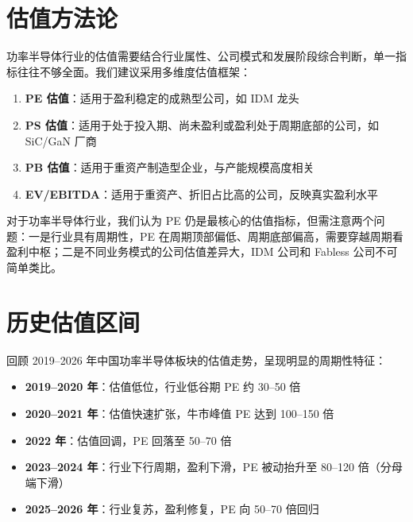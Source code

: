 
\section{估值方法论}

功率半导体行业的估值需要结合行业属性、公司模式和发展阶段综合判断，单一指标往往不够全面。我们建议采用多维度估值框架：

\begin{enumerate}[leftmargin=2em]
\item \textbf{PE 估值}：适用于盈利稳定的成熟型公司，如 IDM 龙头
\item \textbf{PS 估值}：适用于处于投入期、尚未盈利或盈利处于周期底部的公司，如 SiC/GaN 厂商
\item \textbf{PB 估值}：适用于重资产制造型企业，与产能规模高度相关
\item \textbf{EV/EBITDA}：适用于重资产、折旧占比高的公司，反映真实盈利水平
\end{enumerate}

对于功率半导体行业，我们认为 PE 仍是最核心的估值指标，但需注意两个问题：一是行业具有周期性，PE 在周期顶部偏低、周期底部偏高，需要穿越周期看盈利中枢；二是不同业务模式的公司估值差异大，IDM 公司和 Fabless 公司不可简单类比。

\section{历史估值区间}

回顾 2019–2026 年中国功率半导体板块的估值走势，呈现明显的周期性特征：

\begin{itemize}[leftmargin=2em]
\item \textbf{2019–2020 年}：估值低位，行业低谷期 PE 约 30–50 倍
\item \textbf{2020–2021 年}：估值快速扩张，牛市峰值 PE 达到 100–150 倍
\item \textbf{2022 年}：估值回调，PE 回落至 50–70 倍
\item \textbf{2023–2024 年}：行业下行周期，盈利下滑，PE 被动抬升至 80–120 倍（分母端下滑）
\item \textbf{2025–2026 年}：行业复苏，盈利修复，PE 向 50–70 倍回归
\end{itemize}

